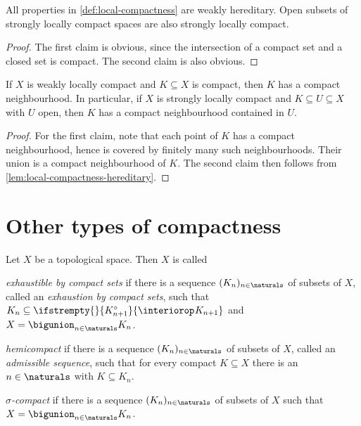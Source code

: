 \documentclass[article, a4paper, 11pt, oneside]{memoir}
\numberwithin{equation}{chapter}
\renewcommand\interior[2][]{%
    \ifstrempty{#1}{%
        #2^{\circ}
    }{%
        \interiorop_{#1}#2
    }%
}
\begin{document}
\begin{lemma}
    \label{lem:local-compactness-hereditary}
    All properties in \cref{def:local-compactness} are weakly hereditary. Open subsets of strongly locally compact spaces are also strongly locally compact.
\end{lemma}

\begin{proof}
    The first claim is obvious, since the intersection of a compact set and a closed set is compact. The second claim is also obvious.
\end{proof}


\begin{lemma}
    \label{thm:LCH-compact-set-has-compact-nhood}
    If $X$ is weakly locally compact and $K \subseteq X$ is compact, then $K$ has a compact neighbourhood. In particular, if $X$ is strongly locally compact and $K \subseteq U \subseteq X$ with $U$ open, then $K$ has a compact neighbourhood contained in $U$.
\end{lemma}

\begin{proof}
    For the first claim, note that each point of $K$ has a compact neighbourhood, hence is covered by finitely many such neighbourhoods. Their union is a compact neighbourhood of $K$. The second claim then follows from \cref{lem:local-compactness-hereditary}.
\end{proof}


\section{Other types of compactness}

\begin{definition}
    \label{def:hemicompact-et-al}
    Let $X$ be a topological space. Then $X$ is called
    \begin{enumdef}
        \item \emph{exhaustible by compact sets} if there is a sequence $(K_n)_{n \in \naturals}$ of subsets of $X$, called an \emph{exhaustion by compact sets}, such that $K_n \subseteq \interior{K_{n+1}}$ and $X = \bigunion_{n \in \naturals} K_n$.
        
        \item \emph{hemicompact} if there is a sequence $(K_n)_{n \in \naturals}$ of subsets of $X$, called an \emph{admissible sequence}, such that for every compact $K \subseteq X$ there is an $n \in \naturals$ with $K \subseteq K_n$.

        \item \emph{$\sigma$-compact} if there is a sequence $(K_n)_{n \in \naturals}$ of subsets of $X$ such that $X = \bigunion_{n \in \naturals} K_n$.
    \end{enumdef}
\end{definition}
\end{document}
